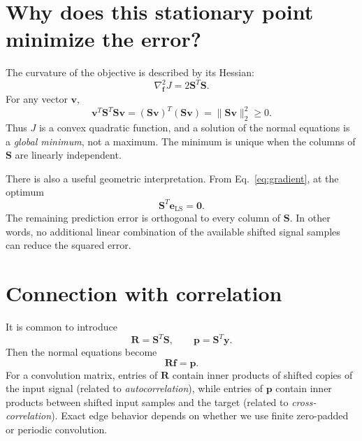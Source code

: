 \documentclass[11pt,letterpaper]{article}
\newcommand{\Smat}{\mathbf{S}}
\newcommand{\fvec}{\mathbf{f}}
\newcommand{\yvec}{\mathbf{y}}
\newcommand{\evec}{\mathbf{e}}
\newcommand{\Rmat}{\mathbf{R}}
\newcommand{\pvec}{\mathbf{p}}
\begin{document}
\section{Why does this stationary point minimize the error?}
The curvature of the objective is described by its Hessian:
\begin{equation}
    \nabla_{\fvec}^2J=2\Smat^T\Smat.
\end{equation}
For any vector $\mathbf{v}$,
\begin{equation}
    \mathbf{v}^T\Smat^T\Smat\mathbf{v}
    =(\Smat\mathbf{v})^T(\Smat\mathbf{v})
    =\|\Smat\mathbf{v}\|_2^2\ge 0.
\end{equation}
Thus $J$ is a convex quadratic function, and a solution of the normal equations
is a \emph{global minimum}, not a maximum. The minimum is unique when the columns
of $\Smat$ are linearly independent.

There is also a useful geometric interpretation. From Eq.~\eqref{eq:gradient},
at the optimum
\begin{equation}
    \boxed{\Smat^T\evec_{\mathrm{LS}}=\mathbf{0}.}
\end{equation}
The remaining prediction error is orthogonal to every column of $\Smat$.
In other words, no additional linear combination of the available shifted
signal samples can reduce the squared error.

\section{Connection with correlation}
It is common to introduce
\begin{equation}
    \Rmat=\Smat^T\Smat,
    \qquad \pvec=\Smat^T\yvec.
\end{equation}
Then the normal equations become
\begin{equation}
    \boxed{\Rmat\fvec=\pvec.}
\end{equation}
For a convolution matrix, entries of $\Rmat$ contain inner products of shifted
copies of the input signal (related to \emph{autocorrelation}), while entries of
$\pvec$ contain inner products between shifted input samples and the target
(related to \emph{cross-correlation}). Exact edge behavior depends on whether
we use finite zero-padded or periodic convolution.
\end{document}

